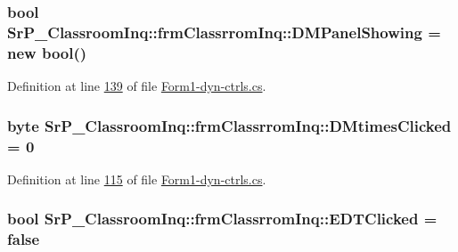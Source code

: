 \hypertarget{class_sr_p___classroom_inq_1_1frm_classrrom_inq_a7a4d3ad70d4284ad3f7d8ab3ca8718e0}{
\subsubsection[{\-D\-M\-Panel\-Showing}]{\setlength{\rightskip}{0pt plus 5cm}bool {\bf \-Sr\-P\-\_\-\-Classroom\-Inq\-::frm\-Classrrom\-Inq\-::\-D\-M\-Panel\-Showing} = new bool()}}
\label{class_sr_p___classroom_inq_1_1frm_classrrom_inq_a7a4d3ad70d4284ad3f7d8ab3ca8718e0}


\-Definition at line \hyperlink{_form1-dyn-ctrls_8cs_source_l00139}{139} of file \hyperlink{_form1-dyn-ctrls_8cs_source}{\-Form1-\/dyn-\/ctrls.\-cs}.

\hypertarget{class_sr_p___classroom_inq_1_1frm_classrrom_inq_a595a5c6942aa919d47de2b3e20f5f5bc}{
\subsubsection[{\-D\-Mtimes\-Clicked}]{\setlength{\rightskip}{0pt plus 5cm}byte {\bf \-Sr\-P\-\_\-\-Classroom\-Inq\-::frm\-Classrrom\-Inq\-::\-D\-Mtimes\-Clicked} = 0}}
\label{class_sr_p___classroom_inq_1_1frm_classrrom_inq_a595a5c6942aa919d47de2b3e20f5f5bc}


\-Definition at line \hyperlink{_form1-dyn-ctrls_8cs_source_l00115}{115} of file \hyperlink{_form1-dyn-ctrls_8cs_source}{\-Form1-\/dyn-\/ctrls.\-cs}.

\hypertarget{class_sr_p___classroom_inq_1_1frm_classrrom_inq_a2f126b875f216c20427f6818976a9465}{
\subsubsection[{\-E\-D\-T\-Clicked}]{\setlength{\rightskip}{0pt plus 5cm}bool {\bf \-Sr\-P\-\_\-\-Classroom\-Inq\-::frm\-Classrrom\-Inq\-::\-E\-D\-T\-Clicked} = false}}
\label{class_sr_p___classroom_inq_1_1frm_classrrom_inq_a2f126b875f216c20427f6818976a9465}


